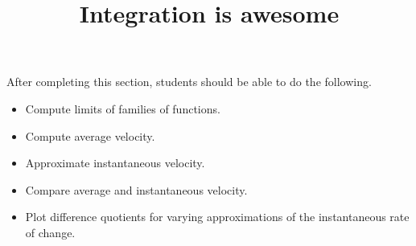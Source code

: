 \documentclass{ximera}
\title{Integration is awesome}
\begin{document}
\begin{abstract}
\end{abstract}

\maketitle

\begin{sectionOutcomes}

After completing this section, students should be able to do the following.

\begin{itemize}
\item Compute limits of families of functions. 
\item Compute average velocity.
\item Approximate instantaneous velocity.
\item Compare average and instantaneous velocity.
\item Plot difference quotients for varying approximations of the
  instantaneous rate of change.
\end{itemize}

\end{sectionOutcomes}
\end{document}
